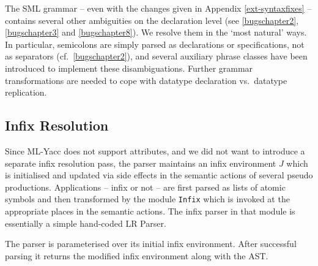 \documentclass[twoside,titlepage]{article}
\newcommand{\void}[1]{}
\begin{document}
\void{
ML-Yacc is a conventional LALR(1) parser generator. However, the grammar given in the Definition together with its disambiguation rules defines a language that cannot be parsed by such standard parsing technology, as it requires infinite look-ahead. The HaMLet parser is therefore incapable of handling all language constructs that are legal according to a strict reading of the Definition. The most annoying example of a problematic phrase is a {\tt case} expression as right hand side of a function binding (see \ref{bugsappendixb}). Most people consider this a bug on the side of the Definition. Consequently, no attempt is currently made to fix it in HaMLet. It could only be dealt with correctly either by horrendous grammar transformations or by some really nasty and expensive lexer hack \cite{mistakes}. 

Disambiguation of expressions is left to ML-Yacc, we simply specify suitable keyword precedences. This seems to be the most appropriate thing to do, as the disambiguation rules in the Definition are ambiguous by themselves (see \ref{bugsappendixb}).
}

The SML grammar -- even with the changes given in Appendix \ref{ext-syntaxfixes} -- contains several other ambiguities on the declaration level (see \ref{bugschapter2}, \ref{bugschapter3} and \ref{bugschapter8}). We resolve them in the `most natural' ways. In particular, semicolons are simply parsed as declarations or specifications, not as separators (cf.\ \ref{bugschapter2}), and several auxiliary phrase classes have been introduced to implement these disambiguations.
Further grammar transformations are needed to cope with datatype declaration vs.\ datatype replication.


\subsection{Infix Resolution}
\label{infix}

Since ML-Yacc does not support attributes, and we did not want to introduce a separate infix resolution pass, the parser maintains an infix environment $J$ which is initialised and updated via side effects in the semantic actions of several pseudo productions. Applications -- infix or not -- are first parsed as lists of atomic symbols and then transformed by the module {\tt Infix} which is invoked at the appropriate places in the semantic actions. The infix parser in that module is essentially a simple hand-coded LR Parser.

The parser is parameterised over its initial infix environment. After successful parsing it returns the modified infix environment along with the AST.
\end{document}
